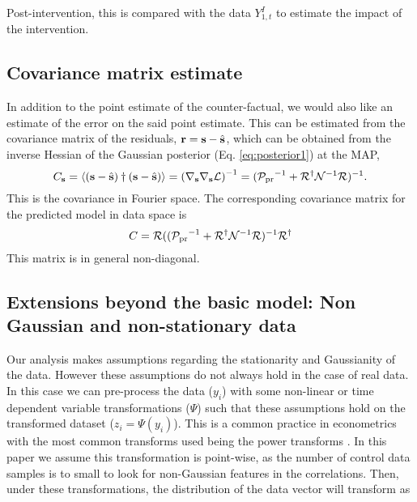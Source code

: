 \documentclass{article}
\def\bs{{\bf s}}
\def\br{{\bf r}}
\def\mR{\mathcal{R}}
\def\pprior{\mathcal{P_{\rm pr}}}
\begin{document}
Post-intervention, this is compared with the data $Y^I_{1, t}$ to estimate the impact of the intervention.

\subsection{Covariance matrix estimate}
\label{sec:cov}

In addition to the point estimate of the counter-factual, we would also like an estimate of the error on the said point estimate. This can be estimated from the covariance matrix of the residuals, $\br = \bs - \hat {\bs}$, which can be obtained from the inverse Hessian of the Gaussian posterior (Eq. \ref{eq:posterior1}) at the MAP,
\begin{equation}
    C_{\bs} = \langle(\bs-\hat{\bs})\dagger (\bs-\hat{\bs})\rangle = \left( \nabla_{\bs}\nabla_{\bs} \mathcal{L}\right)^{-1}= (\pprior^{-1} + \mR^\dagger \mathcal{N}^{-1} \mR)^{-1}. 
    \label{eq:cov}
\end{equation}
This is the covariance in Fourier space. 
The corresponding covariance matrix for the predicted model in data space is
\begin{equation}
    C = \mR((\pprior^{-1} + \mR^\dagger \mathcal{N}^{-1} \mR)^{-1}\mR^\dagger 
    \label{eq:cov2}
\end{equation}
This matrix is in general non-diagonal. 


\subsection{Extensions beyond the basic model: Non Gaussian and non-stationary data}
\label{sec:transforms}
Our analysis makes assumptions regarding the stationarity and Gaussianity of the data. However these assumptions do not always hold in the case of real data.
In this case we can pre-process the data ($y_i$) with some non-linear or time dependent variable transformations ($\Psi$) such that these assumptions hold on the transformed dataset ($z_i = \Psi(y_i)$). This is a common practice in econometrics with the most common transforms used being the power transforms \cite{boxcox, transforms}. In this paper we assume this transformation is point-wise, as the number of control data samples is to small to look for non-Gaussian features in the correlations. 
Then, under these transformations, the distribution of the data vector will transform as \cite{Seljak19}
\end{document}
